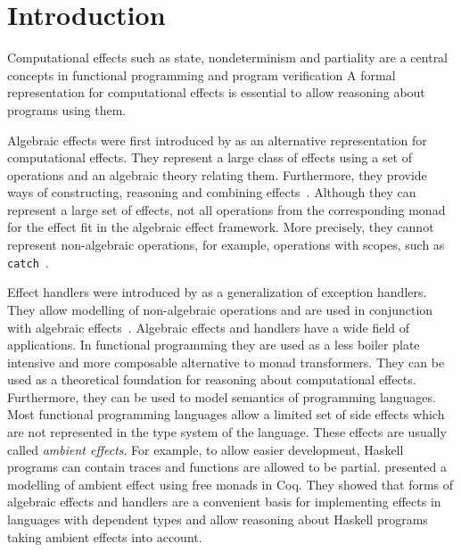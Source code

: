 \documentclass[10pt,a4paper,twoside,notitlepage]{report}
\begin{document}
\newpage

\tableofcontents

\chapter{Introduction}

Computational effects such as state, nondeterminism and partiality are a
central concepts in functional programming and program verification
A formal representation for computational effects is essential to allow
reasoning about programs using them.

Algebraic effects were first introduced by
\textcite{DBLP:journals/acs/PlotkinP03} as an alternative representation for
computational effects.
They represent a large class of effects using a set of operations and an
algebraic theory relating them.
Furthermore, they provide ways of constructing, reasoning and combining
effects~\cite{DBLP:journals/corr/PlotkinP13}.
Although they can represent a large set of effects, not all operations from the
corresponding monad for the effect fit in the algebraic effect framework.
More precisely, they cannot represent non-algebraic operations, for example,
operations with scopes, such as
\texttt{catch}~\cite{DBLP:journals/acs/PlotkinP03}.

Effect handlers were introduced by \textcite{DBLP:conf/esop/PlotkinP09} as a
generalization of exception handlers.
They allow modelling of non-algebraic operations and are used in conjunction
with algebraic effects~\cite{DBLP:journals/corr/PlotkinP13}.
Algebraic effects and handlers have a wide field of applications.
In functional programming they are used as a less boiler plate intensive and
more composable alternative to monad transformers.
They can be used as a theoretical foundation for reasoning about computational
effects.
Furthermore, they can be used to model semantics of programming languages.
Most functional programming languages allow a limited set of side
effects which are not represented in the type system of the language.
These effects are usually called \textit{ambient effects}.
For example, to allow easier development, Haskell programs can contain traces
and functions are allowed to be partial.
\textcite{DBLP:journals/programming/DylusCT19,DBLP:conf/haskell/ChristiansenDB19}
presented a modelling of ambient effect using free monads in Coq.
They showed that forms of algebraic effects and handlers are a convenient basis
for implementing effects in languages with dependent types and allow reasoning
about Haskell programs taking ambient effects into account.
\end{document}
